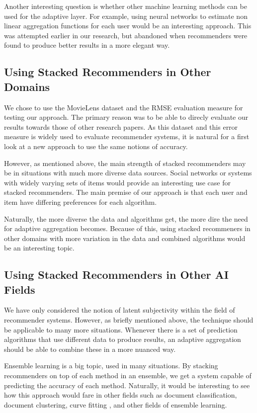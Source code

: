 Another interesting question is whether other machine learning methods can be used for the adaptive layer.
For example, using neural networks to estimate non linear aggregation functions for each user would be an interesting approach.
This was attempted earlier in our research, but abandoned when recommenders were found to produce
better results in a more elegant way. 


\subsection{Using Stacked Recommenders in Other Domains}

We chose to use the MovieLens dataset and the RMSE evaluation measure for testing our approach.
The primary reason was to be able to direcly evaluate our results towards those of other research papers.
As this dataset and this error measure is widely used to evaluate recommender systems,
it is natural for a first look at a new approach to use the same notions of accuracy.

However, as mentioned above, the main strength of stacked recommenders may be
in situations with much more diverse data sources. Social networks or systems
with widely varying sets of items would provide an interesting use case for stacked recommenders.
The main premise of our approach is that each user and item have differing preferences
for each algorithm. 

Naturally, the more diverse the data and algorithms get,
the more dire the need for adaptive aggregation becomes.
Because of this, using stacked recommeners in other domains with more variation 
in the data and combined algorithms would be an interesting topic.


\subsection{Using Stacked Recommenders in Other AI Fields}

We have only considered the notion of latent subjectivity within the field of recommender systems.
However, as briefly mentioned above, the technique should be applicable to many more situations.
Whenever there is a set of prediction algorithms that use different data to produce results,
an adaptive aggregation should be able to combine these in a more nuanced way.

Ensemble learning is a big topic, used in many situations.
By stacking recommenders on top of each method in an ensemble, 
we get a system capable of predicting the accuracy of each method.
Naturally, it would be interesting to see how this approach would fare
in other fields such as document classification, document clustering,
curve fitting \cite[p7]{Polikar2006}, and other fields of ensemble learning.


